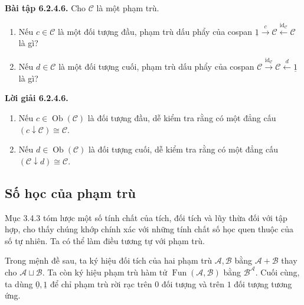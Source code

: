 \noindent\textbf{Bài tập 6.2.4.6.} Cho $\mathcal C$ là một phạm trù.\keepwithnext
\begin{enumerate}[label=\alph*.]\item Nếu $c\in\mathcal C$ là một đối tượng đầu, phạm trù dấu phẩy của cospan $\underline1\xrightarrow c\mathcal C\xleftarrow{\mathrm{id}_{\mathcal C}}\mathcal C$ là gì?\item Nếu $d\in\mathcal C$ là một đối tượng cuối, phạm trù dấu phẩy của cospan $\mathcal C\xrightarrow{\mathrm{id}_{\mathcal C}}\mathcal C\xleftarrow d\underline1$ là gì?\end{enumerate}
\noindent\textbf{Lời giải 6.2.4.6.}\begin{enumerate}[label=\alph*.]\item Nếu $c\in\operatorname{Ob}(\mathcal C)$ là đối tượng đầu, dễ kiểm tra rằng có một đẳng cấu $(c\downarrow\mathcal C)\cong\mathcal C$.\item Nếu $d\in\operatorname{Ob}(\mathcal C)$ là đối tượng cuối, dễ kiểm tra rằng có một đẳng cấu $(\mathcal C\downarrow d)\cong\mathcal C$.\end{enumerate}

\subsection{Số học của phạm trù}
Mục 3.4.3 tóm lược một số tính chất của tích, đối tích và lũy thừa đối với tập hợp, cho thấy chúng khớp chính xác với những tính chất số học quen thuộc của số tự nhiên. Ta có thể làm điều tương tự với phạm trù.

Trong mệnh đề sau, ta ký hiệu đối tích của hai phạm trù $\mathcal A,\mathcal B$ bằng $\mathcal A+\mathcal B$ thay cho $\mathcal A\sqcup\mathcal B$. Ta còn ký hiệu phạm trù hàm tử $\operatorname{Fun}(\mathcal A,\mathcal B)$ bằng $\mathcal B^{\mathcal A}$. Cuối cùng, ta dùng $\underline0,\underline1$ để chỉ phạm trù rời rạc trên $0$ đối tượng và trên $1$ đối tượng tương ứng.

